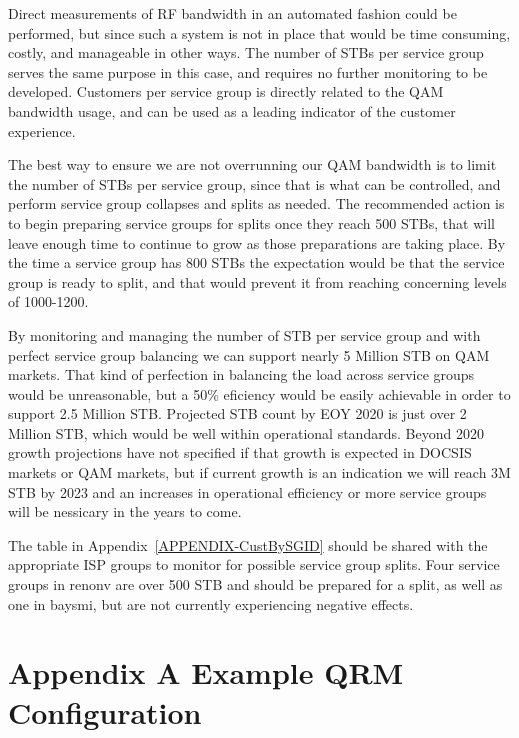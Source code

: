 \documentclass{article}
\begin{document}
Direct measurements of RF bandwidth in an automated fashion could be performed, but since such a system is not in place that would be time consuming, costly, and manageable in other ways. The number of STBs per service group serves the same purpose in this case, and requires no further monitoring to be developed. Customers per service group is directly related to the QAM bandwidth usage, and can be used as a leading indicator of the customer experience. 

The best way to ensure we are not overrunning our QAM bandwidth is to limit the number of STBs per service group, since that is what can be controlled, and perform service group collapses and splits as needed. The recommended action is to begin preparing service groups for splits once they reach 500 STBs, that will leave enough time to continue to grow as those preparations are taking place. By the time a service group has 800 STBs the expectation would be that the service group is ready to split, and that would prevent it from reaching concerning levels of 1000-1200. 

By monitoring and managing the number of STB per service group and with perfect service group balancing we can support nearly 5 Million STB on QAM markets. That kind of perfection in balancing the load across service groups would be unreasonable, but a 50\% eficiency would be easily achievable in order to support 2.5 Million STB. Projected STB count by EOY 2020 is just over 2 Million STB, which would be well within operational standards. Beyond 2020 growth projections have not specified if that growth is expected in DOCSIS markets or QAM markets, but if current growth is an indication we will reach 3M STB by 2023 and an increases in operational efficiency or more service groups will be nessicary in the years to come. 

The table in Appendix~\ref{APPENDIX-CustBySGID} should be shared with the appropriate ISP groups to monitor for possible service group splits. Four service groups in renonv are over 500 STB and should be prepared for a split, as well as one in baysmi, but are not currently experiencing negative effects. 



\newpage

\appendix

\section{Appendix A\: Example QRM Configuration}
\label{APPENDIX-QRMConfig}
\end{document}
